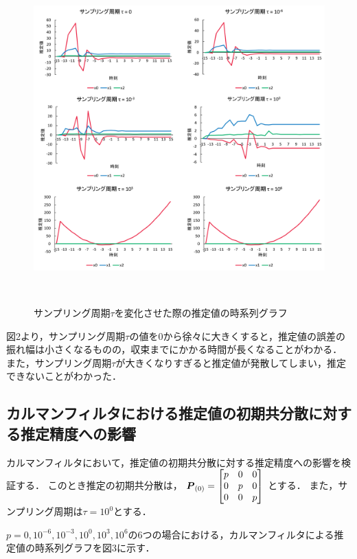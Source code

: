 \documentclass[a4paper]{jarticle}
\begin{document}
\vspace{0mm}
\begin{figure}[!h]
  \centering
  \includegraphics[width=14cm]{kalman2.png}
  \caption{サンプリング周期$\tau$を変化させた際の推定値の時系列グラフ}
　\label{graph}
\end{figure}


図2より，サンプリング周期$\tau$の値を0から徐々に大きくすると，推定値の誤差の振れ幅は小さくなるものの，収束までにかかる時間が長くなることがわかる．
また，サンプリング周期$\tau$が大きくなりすぎると推定値が発散してしまい，推定できないことがわかった．

\subsection{カルマンフィルタにおける推定値の初期共分散に対する推定精度への影響}
カルマンフィルタにおいて，推定値の初期共分散に対する推定精度への影響を検証する．
このとき推定の初期共分散は，
\(
\mbox{\boldmath $P$}_{(0)} =
\begin{bmatrix}
{p} & 0 & 0\\
 0 & {p} & 0\\
0 & 0 & {p} \\ 
\end{bmatrix} 
\)
とする．
また，サンプリング周期は$\tau = 10^0$とする．

\(p=0, 10^{-6}, 10^{-3}, 10^{0}, 10^{3}, 10^{6}\)の6つの場合における，カルマンフィルタによる推定値の時系列グラフを図3に示す．
\end{document}
